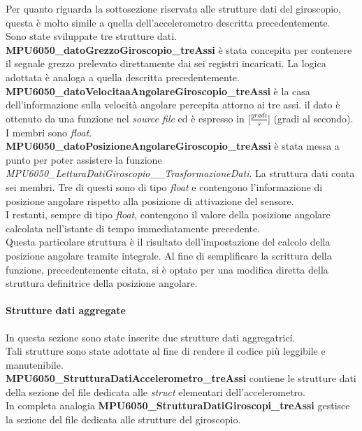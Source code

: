 \documentclass[11pt]{report}
\begin{document}
\newpage

Per quanto riguarda la sottosezione riservata alle strutture dati del giroscopio, questa è  molto simile a quella dell'accelerometro descritta precedentemente.\\
Sono state sviluppate tre strutture dati.\\
\textbf{MPU6050\_datoGrezzoGiroscopio\_treAssi} è stata concepita per contenere il segnale grezzo prelevato direttamente dai sei registri incaricati. La logica adottata è analoga a quella descritta precedentemente.\\
\textbf{MPU6050\_datoVelocitaaAngolareGiroscopio\_treAssi} è la casa dell'informazione sulla velocità angolare percepita attorno ai tre assi. il dato è ottenuto da una funzione nel \textit{source file} ed è espresso in [$\frac{gradi}{s}$] (gradi al secondo). I membri sono \textit{float}.\\
\textbf{MPU6050\_datoPosizioneAngolareGiroscopio\_treAssi} è stata messa a punto per poter assistere la funzione \textit{MPU6050\_LetturaDatiGiroscopio\_\_TrasformazioneDati}. La struttura dati conta sei membri. Tre di questi sono di tipo \textit{float} e contengono l'informazione di posizione angolare rispetto alla posizione di attivazione del sensore.\\
I restanti, sempre di tipo \textit{float}, contengono il valore della posizione angolare calcolata nell'istante di tempo immediatamente precedente.\\
Questa particolare struttura è il risultato dell'impostazione del calcolo della posizione angolare tramite integrale. Al fine di semplificare la scrittura della funzione, precedentemente citata, si è optato per una modifica diretta della struttura definitrice della posizione angolare.


\paragraph{Strutture dati aggregate}
In questa sezione sono state inserite due strutture dati aggregatrici.\\
Tali strutture sono state adottate al fine di rendere il codice più leggibile e manutenibile.\\
\textbf{MPU6050\_StrutturaDatiAccelerometro\_treAssi} contiene le strutture dati della sezione del file dedicata alle \textit{struct} elementari dell'accelerometro.\\In completa analogia
\textbf{MPU6050\_StrutturaDatiGiroscopi\_treAssi} gestisce la sezione del file dedicata alle strutture del giroscopio.

\end{document}
